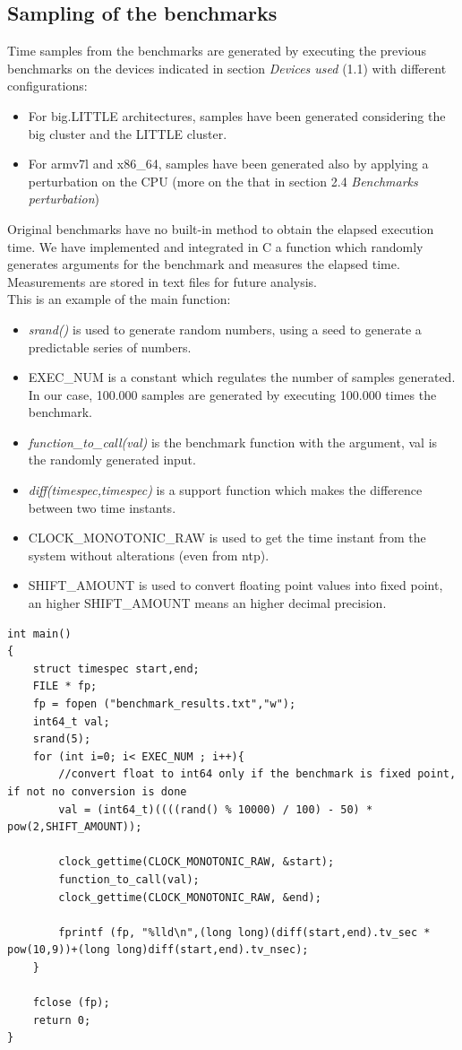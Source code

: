 \subsection{Sampling of the benchmarks}

Time samples from the benchmarks are generated by executing the previous benchmarks on the devices indicated in section \textit{Devices used} (1.1) with different configurations:
\begin{itemize}
	\item For big.LITTLE architectures, samples have been generated considering the big cluster and the LITTLE cluster.
	\item For armv7l and x86\_64, samples have been generated also by applying a perturbation on the CPU (more on the that in section 2.4 \textit{Benchmarks perturbation})
\end{itemize}
Original benchmarks have no built-in method to obtain the elapsed execution time. We have implemented and integrated in C a function which randomly generates arguments for the benchmark and measures the elapsed time.\\
Measurements are stored in text files for future analysis.\\[0.3cm]
This is an example of the main function:
\begin{itemize}
	\item \textit{srand()} is used to generate random numbers, using a seed to generate a predictable series of numbers.
	\item EXEC\_NUM is a constant which regulates the number of samples generated. In our case, 100.000 samples are generated by executing 100.000 times the benchmark.
	\item \textit{function\_to\_call(val)} is the benchmark function with the argument, val is the randomly generated input.
	\item \textit{diff(timespec,timespec)} is a support function which makes the difference between two time instants.
	\item CLOCK\_MONOTONIC\_RAW is used to get the time instant from the system without alterations (even from ntp).
	\item SHIFT\_AMOUNT is used to convert floating point values into fixed point, an higher SHIFT\_AMOUNT means an higher decimal precision.
\end{itemize}
\begin{lstlisting}
int main()
{
	struct timespec start,end;
	FILE * fp;
	fp = fopen ("benchmark_results.txt","w");
	int64_t val;
	srand(5);
	for (int i=0; i< EXEC_NUM ; i++){
		//convert float to int64 only if the benchmark is fixed point, if not no conversion is done
		val = (int64_t)((((rand() % 10000) / 100) - 50) * pow(2,SHIFT_AMOUNT));
		
		clock_gettime(CLOCK_MONOTONIC_RAW, &start);
		function_to_call(val);
		clock_gettime(CLOCK_MONOTONIC_RAW, &end);
		
		fprintf (fp, "%lld\n",(long long)(diff(start,end).tv_sec * pow(10,9))+(long long)diff(start,end).tv_nsec);
	}
	
	fclose (fp);
	return 0;
}
\end{lstlisting}

